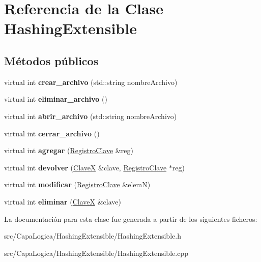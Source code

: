 \hypertarget{class_hashing_extensible}{\section{\-Referencia de la \-Clase \-Hashing\-Extensible}
\label{class_hashing_extensible}
}
\subsection*{\-Métodos públicos}
\begin{DoxyCompactItemize}
\item 
\hypertarget{class_hashing_extensible_a8fc8383f613698ad82d13d21af167d57}{virtual int {\bfseries crear\-\_\-archivo} (std\-::string nombre\-Archivo)}\label{class_hashing_extensible_a8fc8383f613698ad82d13d21af167d57}

\item 
\hypertarget{class_hashing_extensible_a404e78325d0f4ecdb99bd54a235a37aa}{virtual int {\bfseries eliminar\-\_\-archivo} ()}\label{class_hashing_extensible_a404e78325d0f4ecdb99bd54a235a37aa}

\item 
\hypertarget{class_hashing_extensible_a3ca140c52d64af5064760ce66c7a404c}{virtual int {\bfseries abrir\-\_\-archivo} (std\-::string nombre\-Archivo)}\label{class_hashing_extensible_a3ca140c52d64af5064760ce66c7a404c}

\item 
\hypertarget{class_hashing_extensible_a3facb4902781f065d951146ac5d26251}{virtual int {\bfseries cerrar\-\_\-archivo} ()}\label{class_hashing_extensible_a3facb4902781f065d951146ac5d26251}

\item 
\hypertarget{class_hashing_extensible_a75ba638b950035c783e06d5b7d6ba677}{virtual int {\bfseries agregar} (\hyperlink{class_registro_clave}{\-Registro\-Clave} \&reg)}\label{class_hashing_extensible_a75ba638b950035c783e06d5b7d6ba677}

\item 
\hypertarget{class_hashing_extensible_a2efd1fd57af5e07ea8be5c5ad7e5df9a}{virtual int {\bfseries devolver} (\hyperlink{class_clave_x}{\-Clave\-X} \&clave, \hyperlink{class_registro_clave}{\-Registro\-Clave} $\ast$reg)}\label{class_hashing_extensible_a2efd1fd57af5e07ea8be5c5ad7e5df9a}

\item 
\hypertarget{class_hashing_extensible_a0484179336183e3e52d54f3e3bb77367}{virtual int {\bfseries modificar} (\hyperlink{class_registro_clave}{\-Registro\-Clave} \&elem\-N)}\label{class_hashing_extensible_a0484179336183e3e52d54f3e3bb77367}

\item 
\hypertarget{class_hashing_extensible_aa3f43d396d64d4eb015eb62dd52f1a2c}{virtual int {\bfseries eliminar} (\hyperlink{class_clave_x}{\-Clave\-X} \&clave)}\label{class_hashing_extensible_aa3f43d396d64d4eb015eb62dd52f1a2c}

\end{DoxyCompactItemize}


\-La documentación para esta clase fue generada a partir de los siguientes ficheros\-:\begin{DoxyCompactItemize}
\item 
src/\-Capa\-Logica/\-Hashing\-Extensible/\-Hashing\-Extensible.\-h\item 
src/\-Capa\-Logica/\-Hashing\-Extensible/\-Hashing\-Extensible.\-cpp\end{DoxyCompactItemize}
